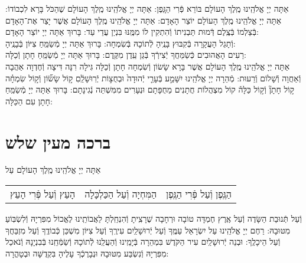 \documentclass[twoside, openany, parskip=half, 11pt]{book}
\begin{document}
\begin{sometimes}
אַתָּה יְיָ אֱלֹהֵֽינוּ מֶֽלֶךְ הָעוֹלָם בּוֹרֵא פְּֿרִי הַגָּֽפֶן:\hfill \break
{}
אַתָּה יְיָ אֱלֹהֵֽינוּ מֶֽלֶךְ הָעוֹלָם שֶׁהַכֹּל בָּרָא לִכְבוֹדוֹ:\hfill \break
{}
אַתָּה יְיָ אֱלֹהֵֽינוּ מֶֽלֶךְ הָעוֹלָם יוֹצֵר הָאָדָם:\hfill \break
{}
אַתָּה יְיָ אֱלֹהֵֽינוּ מֶֽלֶךְ הָעוֹלָם אֲשֶׁר יָצַר אֶת־הָאָדָם בְּֿצַלְמוֹ
בְּֿצֶֽלֶם דְּֿמוּת תַּבְנִיתוֹ וְֿהִתְקִין לוֹ מִמֶּֽנּוּ בִּנְיַן עֲדֵי עַד: בָּרוּךְ אַתָּה יְיָ יוֹצֵר הָאָדָם:\\
וְֿתָגֵל הָעֲקָרָה בְּֿקִבּוּץ בָּנֶֽיהָ לְֿתוֹכָהּ בְּֿשִׂמְחָה:
בָּרוּךְ אַתָּה יְיָ מְֿשַׂמֵּֽחַ צִיּוֹן בְּֿבָנֶֽיהָ:\\
רֵעִים הָאֲהוּבִים כְּֿשַׂמֵּחֲךָ יְֿצִירְֿךָ בְּֿגַן עֵֽדֶן מִקֶּֽדֶם:
בָּרוּךְ אַתָּה יְיָ מְֿשַׂמֵּֽחַ חָתָן וְֿכַלָּה:\\
אַתָּה יְיָ אֱלֹהֵֽינוּ מֶֽלֶךְ הָעוֹלָם
אֲשֶׁר בָּרָא שָׂשׂוֹן וְֿשִׂמְחָה חָתָן וְֿכַלָּה גִּילָה רִנָּה דִּיצָה וְֿחֶדְוָה
אַהֲבָה וְֿאַחֲוָה וְֿשָׁלוֹם וְֿרֵעוּת:
מְֿהֵרָה יְיָ אֱלֹהֵֽינוּ יִשָּׁמַ֣ע
בְּֿעָרֵ֤י יְֿהוּדָה֙ וּבְחֻצ֣וֹת יְֿרֽוּשָׁלַֽ֔םִ
ק֣וֹל שָׂשׂ֞וֹן וְֿק֣וֹל שִׂמְחָ֗ה ק֣וֹל חָתָן֘ וְֿק֣וֹל כַּלָּה֒
קוֹל מִצְהֲלוֹת חֲתָנִים מֵחֻפָּתָם וּנְעָרִים מִמִּשְׁתֵּה נְֿגִינָתָם:
בָּרוּךְ אַתָּה יְיָ מְֿשַׂמֵּֽחַ חָתָן עִם הַכַּלָּה:


\nextpage

\section[ברכה מעין שלש]{ ברכה מעין שלש }


אַתָּה יְיָ אֱלֹהֵֽינוּ מֶֽלֶךְ הָעוֹלָם עַל

\begin{tabular}{>{\centering\arraybackslash}m{} | >{\centering\arraybackslash}m{} | >{\centering\arraybackslash}m{}}

הָעֵץ וְֿעַל פְּֿרִי הָעֵץ
&
הַמִּחְיָה וְֿעַל הַכַּלְכָּלָה
&
הַגֶּֽפֶן וְֿעַל פְּֿרִי הַגֶּֽפֶן \\

\end{tabular}

וְֿעַל תְּֿנוּבַת הַשָּׂדֶה וְֿעַל אֶֽרֶץ חֶמְדָּה טוֹבָה וּרְחָבָה
שֶׁרָצִֽיתָ וְֿהִנְחַֽלְתָּ לַאֲבוֹתֵֽינוּ לֶאֱכוֹל מִפִּרְיָהּ וְֿלִשְׂבּֽוֹעַ מִטּוּבָהּ:
רַחֶם יְיָ אֱלֹהֵֽינוּ עַל יִשְׂרָאֵל עַמֶּֽךָ וְֿעַל יְֿרוּשָׁלַֽיִם עִירֶֽךָ וְֿעַל צִיּוֹן מִשְׁכַּן כְּֿבוֹדֶֽךָ וְֿעַל מִזְבַּחֲךָ וְֿעַל הֵיכָלֶֽךָ: וּבְנֵה יְֿרוּשָׁלַֽיִם עִיר הַקֹּדֶשׁ בִּמְהֵרָה בְּֿיָמֵֽינוּ וְֿהַעֲלֵֽנוּ לְֿתוֹכָהּ וְֿשַׂמְּֿחֵֽנוּ בְּֿבִנְיָנָהּ וְֿנֹאכַל מִפִּרְיָהּ וְֿנִשְׂבַּע מִטּוּבָהּ וּנְבָרֶכְֿךָ עָלֶיהָ בִּקְדֻשָּׁה וּבְטָהֳרָה:


\end{sometimes}
\end{document}
